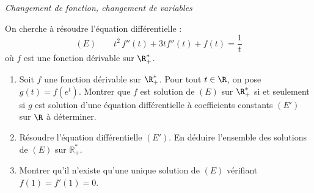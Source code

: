 \documentclass[a4paper,10pt]{report}
\begin{document}

\medskip

\begin{center}
\textit{{ {\large Changement de fonction, changement de variables}}}
\end{center}

\medskip

\begin{Exercice}{} On cherche à résoudre l'équation différentielle :
$$ (E) \qquad t^2\,f''(t) + 3 t f''(t)+f(t)  = \dfrac{1}{t} $$
où $f$ est une fonction dérivable sur $\R_+^*$.
\begin{enumerate}
\item Soit $f$ une fonction dérivable sur $\R_+^*$. Pour tout $t\in \R$, on pose $g(t)=f(e^{t})$. Montrer que $f$ est solution de $(E)$ sur $\R_+^*$ si et seulement si $g$ est solution d'une équation différentielle à coefficients constants $(E')$ sur $\R$ à déterminer.
\item Résoudre l'équation différentielle $(E')$. En déduire l'ensemble des solutions de $(E)$ sur $\mathbb{R}^*_+$.
\item Montrer qu'il n'existe qu'une unique solution de $(E)$ vérifiant $f(1)=f'(1)=0$.
\end{enumerate}
\end{Exercice}
\end{document}

